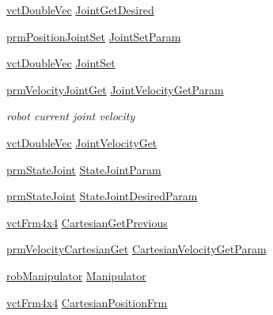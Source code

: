 \begin{DoxyCompactItemize}
\item 
\hyperlink{vct_dynamic_vector_types_8h_ade4b3068c86fb88f41af2e5187e491c2}{vct\-Double\-Vec} \hyperlink{classmts_intuitive_research_kit_arm_a422d2173d1932addd901900c61b1dd11}{Joint\-Get\-Desired}
\item 
\hyperlink{classprm_position_joint_set}{prm\-Position\-Joint\-Set} \hyperlink{classmts_intuitive_research_kit_arm_aa0702f82bb6fd659326d49cec3e37c25}{Joint\-Set\-Param}
\item 
\hyperlink{vct_dynamic_vector_types_8h_ade4b3068c86fb88f41af2e5187e491c2}{vct\-Double\-Vec} \hyperlink{classmts_intuitive_research_kit_arm_a944bbb1f8a925a9c6d2e4cee2ef5ae54}{Joint\-Set}
\item 
\hyperlink{classprm_velocity_joint_get}{prm\-Velocity\-Joint\-Get} \hyperlink{classmts_intuitive_research_kit_arm_a07af1da75d6287b1e765dae1aa41a75b}{Joint\-Velocity\-Get\-Param}
\begin{DoxyCompactList}\small\item\em robot current joint velocity \end{DoxyCompactList}\item 
\hyperlink{vct_dynamic_vector_types_8h_ade4b3068c86fb88f41af2e5187e491c2}{vct\-Double\-Vec} \hyperlink{classmts_intuitive_research_kit_arm_a5c315f1c881989dc7396cfe903a7fbfe}{Joint\-Velocity\-Get}
\item 
\hyperlink{classprm_state_joint}{prm\-State\-Joint} \hyperlink{classmts_intuitive_research_kit_arm_aa49ed16b78469f2e5b811077eadc04a4}{State\-Joint\-Param}
\item 
\hyperlink{classprm_state_joint}{prm\-State\-Joint} \hyperlink{classmts_intuitive_research_kit_arm_a488dfec6eb01a2a6bcd6838495219578}{State\-Joint\-Desired\-Param}
\item 
\hyperlink{vct_transformation_types_8h_a33da47f4deb2556b37a69a2c44b29d75}{vct\-Frm4x4} \hyperlink{classmts_intuitive_research_kit_arm_abbcadc5cabd409baffbbce14fbd0c6a9}{Cartesian\-Get\-Previous}
\item 
\hyperlink{classprm_velocity_cartesian_get}{prm\-Velocity\-Cartesian\-Get} \hyperlink{classmts_intuitive_research_kit_arm_a1b90c6afd8759c41e232547e12586509}{Cartesian\-Velocity\-Get\-Param}
\item 
\hyperlink{classrob_manipulator}{rob\-Manipulator} \hyperlink{classmts_intuitive_research_kit_arm_a23c8e64cf6cf630a5410cf433995c403}{Manipulator}
\item 
\hyperlink{vct_transformation_types_8h_a33da47f4deb2556b37a69a2c44b29d75}{vct\-Frm4x4} \hyperlink{classmts_intuitive_research_kit_arm_ae5daa9b91ff92c29f280815c118e6520}{Cartesian\-Position\-Frm}

\end{DoxyCompactItemize}
